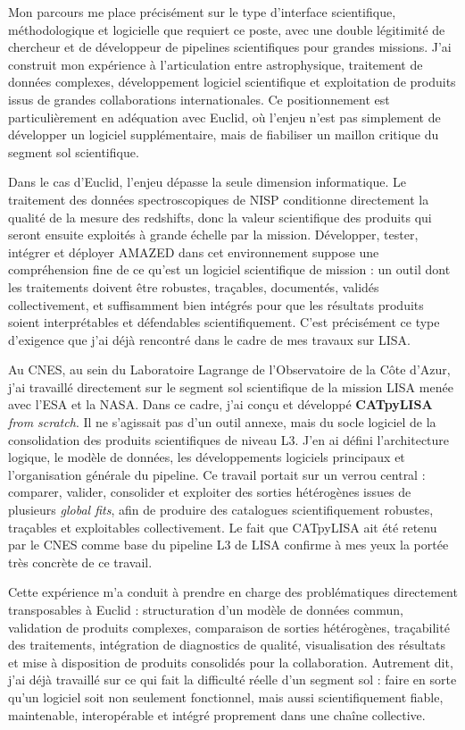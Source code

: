 \documentclass[11pt,a4paper]{altacv}
\begin{document}
{{{{Mon parcours me place précisément sur le type d'interface scientifique, méthodologique et logicielle que requiert ce poste, avec une double légitimité de chercheur et de développeur de pipelines scientifiques pour grandes missions. J'ai construit mon expérience à l'articulation entre astrophysique, traitement de données complexes, développement logiciel scientifique et exploitation de produits issus de grandes collaborations internationales. Ce positionnement est particulièrement en adéquation avec Euclid, où l'enjeu n'est pas simplement de développer un logiciel supplémentaire, mais de fiabiliser un maillon critique du segment sol scientifique.

Dans le cas d'Euclid, l'enjeu dépasse la seule dimension informatique. Le traitement des données spectroscopiques de NISP conditionne directement la qualité de la mesure des redshifts, donc la valeur scientifique des produits qui seront ensuite exploités à grande échelle par la mission. Développer, tester, intégrer et déployer AMAZED dans cet environnement suppose une compréhension fine de ce qu'est un logiciel scientifique de mission : un outil dont les traitements doivent être robustes, traçables, documentés, validés collectivement, et suffisamment bien intégrés pour que les résultats produits soient interprétables et défendables scientifiquement. C'est précisément ce type d'exigence que j'ai déjà rencontré dans le cadre de mes travaux sur LISA.

Au CNES, au sein du Laboratoire Lagrange de l'Observatoire de la Côte d'Azur, j'ai travaillé directement sur le segment sol scientifique de la mission LISA menée avec l'ESA et la NASA. Dans ce cadre, j'ai conçu et développé \textbf{CATpyLISA} \textit{from scratch}. Il ne s'agissait pas d'un outil annexe, mais du socle logiciel de la consolidation des produits scientifiques de niveau L3. J'en ai défini l'architecture logique, le modèle de données, les développements logiciels principaux et l'organisation générale du pipeline. Ce travail portait sur un verrou central : comparer, valider, consolider et exploiter des sorties hétérogènes issues de plusieurs \textit{global fits}, afin de produire des catalogues scientifiquement robustes, traçables et exploitables collectivement. Le fait que CATpyLISA ait été retenu par le CNES comme base du pipeline L3 de LISA confirme à mes yeux la portée très concrète de ce travail.

Cette expérience m'a conduit à prendre en charge des problématiques directement transposables à Euclid : structuration d'un modèle de données commun, validation de produits complexes, comparaison de sorties hétérogènes, traçabilité des traitements, intégration de diagnostics de qualité, visualisation des résultats et mise à disposition de produits consolidés pour la collaboration. Autrement dit, j'ai déjà travaillé sur ce qui fait la difficulté réelle d'un segment sol : faire en sorte qu'un logiciel soit non seulement fonctionnel, mais aussi scientifiquement fiable, maintenable, interopérable et intégré proprement dans une chaîne collective.

}}}}
\end{document}
